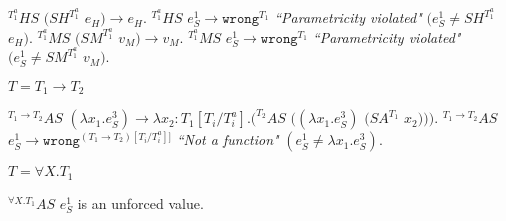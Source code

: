 \begin{case}
\begin{subcase}
$^{T_{1}^{a}}HS$ $(SH^{T_{1}^{a}}$ $e_{H})\rightarrow e_{H}$.  $^{T_{1}^{a}}HS$ $e_{S}^{1}\rightarrow\mathtt{wrong}^{T_{1}}$ \emph{``Parametricity violated"} $(e_{S}^{1}\neq SH^{T_{1}^{a}}$ $e_{H})$.  $^{T_{1}^{a}}MS$ $(SM^{T_{1}^{a}}$ $v_{M})\rightarrow v_{M}$.  $^{T_{1}^{a}}MS$ $e_{S}^{1}\rightarrow\mathtt{wrong}^{T_{1}}$ \emph{``Parametricity violated"} $(e_{S}^{1}\neq SM^{T_{1}^{a}}$ $v_{M})$.

\end{subcase}

\begin{subcase}

$T=T_{1}\rightarrow T_{2}$

$^{T_{1}\rightarrow T_{2}}AS$ $(\lambda x_{1}.e_{S}^{3})\rightarrow\lambda x_{2}:T_{1}[T_{i}/T^{a}_{i}].(^{T_{2}}AS$ $((\lambda x_{1}.e_{S}^{3})$ $(SA^{T_{1}}$ $x_{2})))$.  $^{T_{1}\rightarrow T_{2}}AS$ $e_{S}^{1}\rightarrow\mathtt{wrong}^{(T_{1}\rightarrow T_{2})[T_{i}/T_{i}^{a}]]}$ \emph{``Not a function"} $(e_{S}^{1}\neq\lambda x_{1}.e_{S}^{3})$.

\end{subcase}

\begin{subcase}

$T=\forall X.T_{1}$

$^{\forall X.T_{1}}AS$ $e_{S}^{1}$ is an unforced value.

\end{subcase}

\end{case}